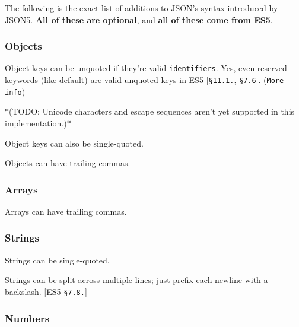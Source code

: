 The following is the exact list of additions to J\+S\+O\+N’s syntax introduced by J\+S\+O\+N5. {\bfseries All of these are optional}, and {\bfseries all of these come from E\+S5}.

\subsubsection*{Objects}


\begin{DoxyItemize}
\item Object keys can be unquoted if they’re valid \href{https://developer.mozilla.org/en/Core_JavaScript_1.5_Guide/Core_Language_Features#Variables}{\tt identifiers}. Yes, even reserved keywords (like {\ttfamily default}) are valid unquoted keys in E\+S5 \mbox{[}\href{http://es5.github.com/#x11.1.5}{\tt §11.1.}, \href{http://es5.github.com/#x7.6}{\tt §7.6}\mbox{]}. (\href{https://mathiasbynens.be/notes/javascript-identifiers}{\tt More info})

$\ast$(T\+O\+DO\+: Unicode characters and escape sequences aren’t yet supported in this implementation.)$\ast$
\item Object keys can also be single-\/quoted.
\item Objects can have trailing commas.
\end{DoxyItemize}

\subsubsection*{Arrays}


\begin{DoxyItemize}
\item Arrays can have trailing commas.
\end{DoxyItemize}

\subsubsection*{Strings}


\begin{DoxyItemize}
\item Strings can be single-\/quoted.
\item Strings can be split across multiple lines; just prefix each newline with a backslash. \mbox{[}E\+S5 \href{http://es5.github.com/#x7.8.4}{\tt §7.8.}\mbox{]}
\end{DoxyItemize}

\subsubsection*{Numbers}



